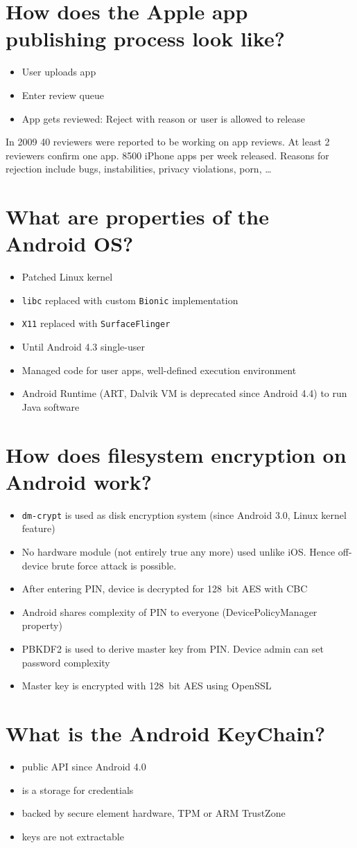 \documentclass[twocolumn]{article}
\newcommand{\question}[1]{\section{#1}}
\begin{document}
\question{How does the Apple app publishing process look like?}
%
\begin{itemize}
  \item User uploads app
  \item Enter review queue
  \item App gets reviewed: Reject with reason or user is allowed to release
\end{itemize}

In 2009 40 reviewers were reported to be working on app reviews. At least 2 reviewers confirm one app. 8500 iPhone apps per week released. Reasons for rejection include bugs, instabilities, privacy violations, porn, \dots

\question{What are properties of the Android OS?}
%
\begin{itemize}
  \item Patched Linux kernel
  \item \texttt{libc} replaced with custom \texttt{Bionic} implementation
  \item \texttt{X11} replaced with \texttt{SurfaceFlinger}
  \item Until Android 4.3 single-user
  \item Managed code for user apps, well-defined execution environment
  \item Android Runtime (ART, Dalvik VM is deprecated since Android 4.4) to run Java software
\end{itemize}

\question{How does filesystem encryption on Android work?}
%
\begin{itemize}
  \item \texttt{dm-crypt} is used as disk encryption system (since Android 3.0, Linux kernel feature)
  \item No hardware module (not entirely true any more) used unlike iOS. Hence off-device brute force attack is possible.
  \item After entering PIN, device is decrypted for 128~bit AES with CBC
  \item Android shares complexity of PIN to everyone (DevicePolicyManager property)
  \item PBKDF2 is used to derive master key from PIN. Device admin can set password complexity
  \item Master key is encrypted with 128~bit AES using OpenSSL
\end{itemize}

\question{What is the Android KeyChain?}
%
\begin{itemize}
  \item public API since Android 4.0
  \item is a storage for credentials
  \item backed by secure element hardware, TPM or ARM TrustZone
  \item keys are not extractable
\end{itemize}
\end{document}
